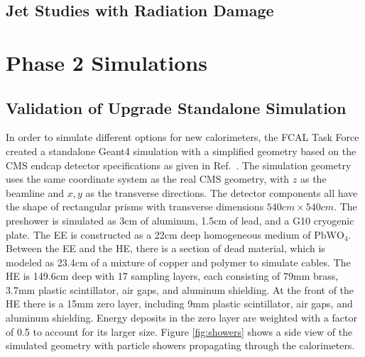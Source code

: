 \subsection{Jet Studies with Radiation Damage}

\section{Phase 2 Simulations}

\subsection{Validation of Upgrade Standalone Simulation}
\label{sec:newdetval}

In order to simulate different options for new calorimeters, the FCAL Task Force created a standalone Geant4 simulation with a simplified geometry based on the CMS endcap detector specifications as given in Ref.~\cite{cmsatcern}. The simulation geometry uses the same coordinate system as the real CMS geometry, with $z$ as the beamline and $x, y$ as the transverse directions. The detector components all have the shape of rectangular prisms with transverse dimensions $540\unit{cm} \times 540\unit{cm}$. The preshower is simulated as 3\unit{cm} of aluminum, 1.5\unit{cm} of lead, and a G10 cryogenic plate. The EE is constructed as a 22\unit{cm} deep homogeneous medium of $\text{PbWO}_{4}$. Between the EE and the HE, there is a section of dead material, which is modeled as 23.4\unit{cm} of a mixture of copper and polymer to simulate cables. The HE is 149.6\unit{cm} deep with 17 sampling layers, each consisting of 79\unit{mm} brass, 3.7\unit{mm} plastic scintillator, air gaps, and aluminum shielding. At the front of the HE there is a 15\unit{mm} zero layer, including 9\unit{mm} plastic scintillator, air gaps, and aluminum shielding. Energy deposits in the zero layer are weighted with a factor of 0.5 to account for its larger size.  Figure \ref{fig:showers} shows a side view of the simulated geometry with particle showers propagating through the calorimeters.

